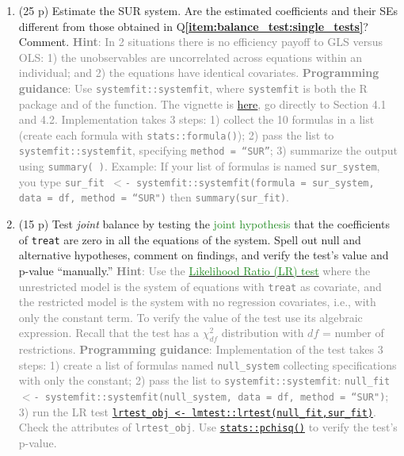 \documentclass{article}
\begin{document}
\begin{enumerate}[label=\textbf{Q\arabic{enumi}}.,ref=Q\arabic{enumi}, wide=0pt, itemsep=1em, topsep=5pt]
\begin{enumerate}[wide, labelindent=0pt]
\item (25 p) Estimate the SUR system. Are the estimated coefficients and their SEs different from those obtained in Q\textbf{\ref{item:balance_test:single_tests}}? Comment. \textcolor{gray}{\textbf{Hint}: In 2 situations there is no efficiency payoff to GLS versus OLS: 1) the unobservables are uncorrelated across equations within an individual; and 2) the equations have identical covariates. \textbf{Programming guidance}: Use \texttt{systemfit::systemfit}, where \texttt{systemfit} is both the R package and of the function. The vignette is \href{https://cran.r-project.org/web/packages/systemfit/vignettes/systemfit.pdf}{here}, go directly to Section 4.1 and 4.2. Implementation takes 3 steps: 1) collect the 10 formulas in a list (create each formula with \texttt{stats::formula()}); 2) pass the list to \texttt{systemfit::systemfit}, specifying \texttt{method = ``SUR''}; 3) summarize the output using \texttt{summary( )}. Example: If your list of formulas is named \texttt{sur\_system}, you type \texttt{sur\_fit $<$- systemfit::systemfit(formula = sur\_system, data = df, method = ``SUR")} then \texttt{summary(sur\_fit)}.}

\item (15 p) Test \textit{joint} balance by testing the \textcolor{ForestGreen}{joint hypothesis} that the coefficients of \texttt{treat} are zero in all the equations of the system. Spell out null and alternative hypotheses, comment on findings, and verify the test's value and p-value ``manually.'' \textcolor{gray}{\textbf{Hint}: Use the \href{https://en.wikipedia.org/wiki/Likelihood-ratio_test}{\textcolor{ForestGreen}{Likelihood Ratio (LR) test}} where the unrestricted model is the system of equations with \texttt{treat} as covariate, and the restricted model is the system with no regression covariates, i.e., with only the constant term. To verify the value of the test use its algebraic expression. Recall that the test has a $\chi^{2}_{df}$ distribution with $df$ = number of restrictions. \textbf{Programming guidance}: Implementation of the test takes 3 steps: 1) create a list of formulas named \texttt{null\_system} collecting specifications with only the constant; 2) pass the list to \texttt{systemfit::systemfit}: \texttt{null\_fit $<$- systemfit::systemfit(null\_system, data = df, method = ``SUR")}; 3) run the LR test \href{https://rdrr.io/cran/lmtest/man/lrtest.html}{\texttt{lrtest\_obj <- lmtest::lrtest(null\_fit,sur\_fit)}}. Check the attributes of \texttt{lrtest\_obj}. Use \href{https://www.statology.org/chi-square-distribution-in-r-dchisq-pchisq-qchisq-rchisq/}{\texttt{stats::pchisq()}} to verify the test's p-value.}
\end{enumerate}


\end{enumerate}
\end{document}
